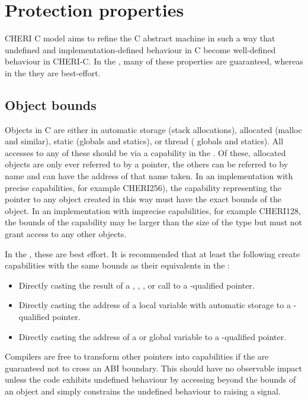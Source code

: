 \section{Protection properties}

CHERI C model aims to refine the C abstract machine in such a way that undefined and implementation-defined behaviour in C become well-defined behaviour in CHERI-C.
In the \purecapABI{}, many of these properties are guaranteed, whereas in the \hybridABI{} they are best-effort.

\subsection{Object bounds}

Objects in C are either in automatic storage (stack allocations), allocated (malloc and similar), static (globals and statics), or thread ( globals and statics).
All accesses to any of these should be via a capability in the \purecapABI{}.
Of these, allocated objects are only ever referred to by a pointer, the others can be referred to by name and can have the address of that name taken.
In an implementation with precise capabilities, for example CHERI256), the capability representing the pointer to any object created in this way must have the exact bounds of the object.
In an implementation with imprecise capabilities, for example CHERI128, the bounds of the capability may be larger than the size of the type but must not grant access to any other objects.

In the \hybridABI{}, these are best effort.
It is recommended that at least the following create capabilities with the same bounds as their equivalents in the \purecapABI{}:
\begin{itemize}
	\item Directly casting the result of a , , , or  call to a -qualified pointer.
	\item Directly casting the address of a local variable with automatic storage to a -qualified pointer.
	\item Directly casting the address of a  or global variable to a -qualified pointer.
\end{itemize}

Compilers are free to transform other pointers into capabilities if the are guaranteed not to cross an ABI boundary.
This should have no observable impact unless the code exhibits undefined behaviour by accessing beyond the bounds of an object and simply constrains the undefined behaviour to raising a signal.

